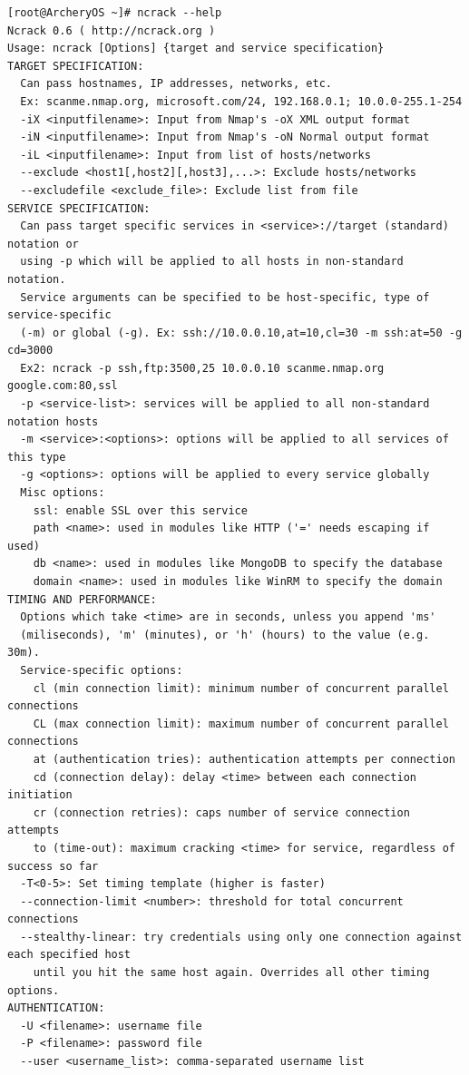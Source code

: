 \documentclass{article}
\begin{document}
\begin{lstlisting}
[root@ArcheryOS ~]# ncrack --help
Ncrack 0.6 ( http://ncrack.org )
Usage: ncrack [Options] {target and service specification}
TARGET SPECIFICATION:
  Can pass hostnames, IP addresses, networks, etc.
  Ex: scanme.nmap.org, microsoft.com/24, 192.168.0.1; 10.0.0-255.1-254
  -iX <inputfilename>: Input from Nmap's -oX XML output format
  -iN <inputfilename>: Input from Nmap's -oN Normal output format
  -iL <inputfilename>: Input from list of hosts/networks
  --exclude <host1[,host2][,host3],...>: Exclude hosts/networks
  --excludefile <exclude_file>: Exclude list from file
SERVICE SPECIFICATION:
  Can pass target specific services in <service>://target (standard) notation or
  using -p which will be applied to all hosts in non-standard notation.
  Service arguments can be specified to be host-specific, type of service-specific
  (-m) or global (-g). Ex: ssh://10.0.0.10,at=10,cl=30 -m ssh:at=50 -g cd=3000
  Ex2: ncrack -p ssh,ftp:3500,25 10.0.0.10 scanme.nmap.org google.com:80,ssl
  -p <service-list>: services will be applied to all non-standard notation hosts
  -m <service>:<options>: options will be applied to all services of this type
  -g <options>: options will be applied to every service globally
  Misc options:
    ssl: enable SSL over this service
    path <name>: used in modules like HTTP ('=' needs escaping if used)
    db <name>: used in modules like MongoDB to specify the database
    domain <name>: used in modules like WinRM to specify the domain
TIMING AND PERFORMANCE:
  Options which take <time> are in seconds, unless you append 'ms'
  (miliseconds), 'm' (minutes), or 'h' (hours) to the value (e.g. 30m).
  Service-specific options:
    cl (min connection limit): minimum number of concurrent parallel connections
    CL (max connection limit): maximum number of concurrent parallel connections
    at (authentication tries): authentication attempts per connection
    cd (connection delay): delay <time> between each connection initiation
    cr (connection retries): caps number of service connection attempts
    to (time-out): maximum cracking <time> for service, regardless of success so far
  -T<0-5>: Set timing template (higher is faster)
  --connection-limit <number>: threshold for total concurrent connections
  --stealthy-linear: try credentials using only one connection against each specified host 
    until you hit the same host again. Overrides all other timing options.
AUTHENTICATION:
  -U <filename>: username file
  -P <filename>: password file
  --user <username_list>: comma-separated username list

\end{lstlisting}
\end{document}
